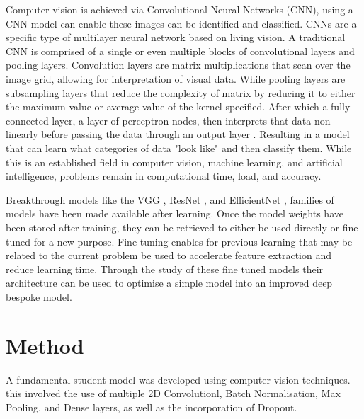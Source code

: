 \documentclass[10pt,twocolumn,letterpaper]{article}
\begin{document}
Computer vision is achieved via Convolutional Neural Networks (CNN), using a CNN model can enable these images can be identified and classified. CNNs are a specific type of multilayer neural network based on living vision. A traditional CNN is comprised of a single or even multiple blocks of convolutional layers and pooling layers. Convolution layers are matrix multiplications that scan over the image grid, allowing for interpretation of visual data. While pooling layers are subsampling layers that reduce the complexity of matrix by reducing it to either the maximum value or average value of the kernel specified. After which a fully connected layer, a layer of perceptron nodes, then interprets that data non-linearly before passing the data through an output layer \cite{recent_trends}. Resulting in a model that can learn what categories of data "look like" and then classify them. While this is an established field in computer vision, machine learning, and artificial intelligence, problems remain in computational time, load, and accuracy. 

Breakthrough models like the VGG \cite{original_vgg}, ResNet \cite{original_resnet}, and EfficientNet \cite{original_efficientnet}, families of models have been made available after learning. Once the model weights have been stored after training, they can be retrieved to either be used directly or fine tuned for a new purpose. Fine tuning enables for previous learning that may be related to the current problem be used to accelerate feature extraction and reduce learning time. Through the study of these fine tuned models their architecture can be used to optimise a simple model into an improved deep bespoke model.  


\section{Method}
\label{sec:method}
A fundamental student model was developed using computer vision techniques. this involved the use of multiple 2D Convolutionl, Batch Normalisation, Max Pooling, and Dense layers, as well as the incorporation of Dropout.
\end{document}
